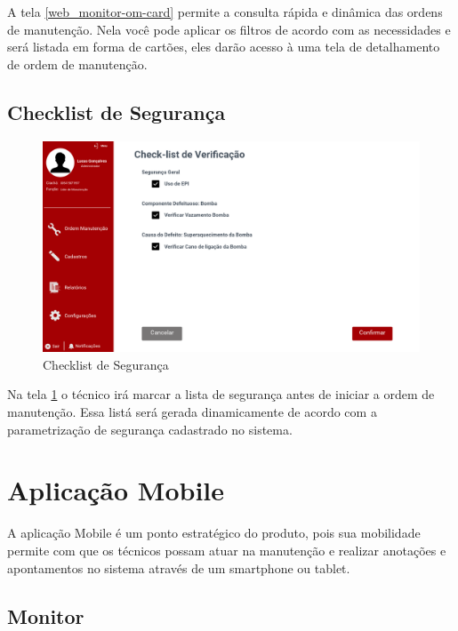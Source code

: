 A tela \ref{web_monitor-om-card} permite a consulta rápida e dinâmica das ordens de manutenção. Nela você pode aplicar os filtros de acordo com as necessidades e será listada em forma de cartões, eles darão acesso à uma tela de detalhamento de ordem de manutenção.

\subsection{Checklist de Segurança}

\begin{figure}[H]
	\caption{\label{web_check-list}Checklist de Segurança}
	\begin{center}
		\includegraphics[scale=0.45]{./Figuras/web/check-list.png}
	\end{center}
\end{figure}

Na tela \ref{web_check-list} o técnico irá marcar a lista de segurança antes de iniciar a ordem de manutenção. Essa listá será gerada dinamicamente de acordo com a parametrização de segurança cadastrado no sistema.

\section{Aplicação Mobile}
A aplicação Mobile é um ponto estratégico do produto, pois sua mobilidade permite com que os técnicos possam atuar na manutenção e realizar anotações e apontamentos no sistema através de um smartphone ou tablet.

\subsection{Monitor}

